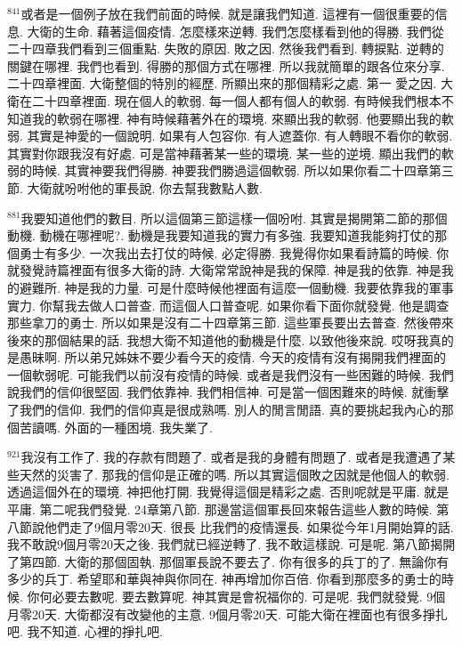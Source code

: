 \documentclass{book}
\begin{document}
$^{841}$或者是一個例子放在我們前面的時候.
就是讓我們知道.
這裡有一個很重要的信息.
大衛的生命.
藉著這個疫情.
怎麼樣來逆轉.
我們怎麼樣看到他的得勝.
我們從二十四章我們看到三個重點.
失敗的原因.
敗之因.
然後我們看到.
轉捩點.
逆轉的關鍵在哪裡.
我們也看到.
得勝的那個方式在哪裡.
所以我就簡單的跟各位來分享.
二十四章裡面.
大衛整個的特別的經歷.
所顯出來的那個精彩之處.
第一 愛之因.
大衛在二十四章裡面.
現在個人的軟弱.
每一個人都有個人的軟弱.
有時候我們根本不知道我的軟弱在哪裡.
神有時候藉著外在的環境.
來顯出我的軟弱.
他要顯出我的軟弱.
其實是神愛的一個說明.
如果有人包容你.
有人遮蓋你.
有人轉眼不看你的軟弱.
其實對你跟我沒有好處.
可是當神藉著某一些的環境.
某一些的逆境.
顯出我們的軟弱的時候.
其實神要我們得勝.
神要我們勝過這個軟弱.
所以如果你看二十四章第三節.
大衛就吩咐他的軍長說.
你去幫我數點人數.

$^{881}$我要知道他們的數目.
所以這個第三節這樣一個吩咐.
其實是揭開第二節的那個動機.
動機在哪裡呢?.
動機是我要知道我的實力有多強.
我要知道我能夠打仗的那個勇士有多少.
一次我出去打仗的時候.
必定得勝.
我覺得你如果看詩篇的時候.
你就發覺詩篇裡面有很多大衛的詩.
大衛常常說神是我的保障.
神是我的依靠.
神是我的避難所.
神是我的力量.
可是什麼時候他裡面有這麼一個動機.
我要依靠我的軍事實力.
你幫我去做人口普查.
而這個人口普查呢.
如果你看下面你就發覺.
他是調查那些拿刀的勇士.
所以如果是沒有二十四章第三節.
這些軍長要出去普查.
然後帶來後來的那個結果的話.
我想大衛不知道他的動機是什麼.
以致他後來說.
哎呀我真的是愚昧啊.
所以弟兄姊妹不要少看今天的疫情.
今天的疫情有沒有揭開我們裡面的一個軟弱呢.
可能我們以前沒有疫情的時候.
或者是我們沒有一些困難的時候.
我們說我們的信仰很堅固.
我們依靠神.
我們相信神.
可是當一個困難來的時候.
就衝擊了我們的信仰.
我們的信仰真是很成熟嗎.
別人的閒言閒語.
真的要挑起我內心的那個苦讀嗎.
外面的一種困境.
我失業了.

$^{921}$我沒有工作了.
我的存款有問題了.
或者是我的身體有問題了.
或者是我遭遇了某些天然的災害了.
那我的信仰是正確的嗎.
所以其實這個敗之因就是他個人的軟弱.
透過這個外在的環境.
神把他打開.
我覺得這個是精彩之處.
否則呢就是平庸.
就是平庸.
第二呢我們發覺.
24章第八節.
那邊當這個軍長回來報告這些人數的時候.
第八節說他們走了9個月零20天.
很長 比我們的疫情還長.
如果從今年1月開始算的話.
我不敢說9個月零20天之後.
我們就已經逆轉了.
我不敢這樣說.
可是呢.
第八節揭開了第四節.
大衛的那個固執.
那個軍長說不要去了.
你有很多的兵丁的了.
無論你有多少的兵丁.
希望耶和華與神與你同在.
神再增加你百倍.
你看到那麼多的勇士的時候.
你何必要去數呢.
要去數算呢.
神其實是會祝福你的.
可是呢.
我們就發覺.
9個月零20天.
大衛都沒有改變他的主意.
9個月零20天.
可能大衛在裡面也有很多掙扎吧.
我不知道.
心裡的掙扎吧.
\end{document}
